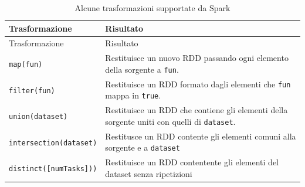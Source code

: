 \documentclass[italian,a4paper, twoside, 12pt]{report}
\begin{document}
\begin{longtable}[]{@{}ll@{}}
\caption{Alcune trasformazioni supportate da Spark}\tabularnewline
\toprule
\begin{minipage}[b]{0.34\columnwidth}\raggedright\strut
Trasformazione\strut
\end{minipage} & \begin{minipage}[b]{0.57\columnwidth}\raggedright\strut
Risultato\strut
\end{minipage}\tabularnewline
\midrule
\endfirsthead
\toprule
\begin{minipage}[b]{0.34\columnwidth}\raggedright\strut
Trasformazione\strut
\end{minipage} & \begin{minipage}[b]{0.57\columnwidth}\raggedright\strut
Risultato\strut
\end{minipage}\tabularnewline
\midrule
\endhead
\begin{minipage}[t]{0.34\columnwidth}\raggedright\strut
\lstinline!map(fun)!\strut
\end{minipage} & \begin{minipage}[t]{0.57\columnwidth}\raggedright\strut
Restituisce un nuovo RDD passando ogni elemento della sorgente a
\lstinline!fun!.\strut
\end{minipage}\tabularnewline
\begin{minipage}[t]{0.34\columnwidth}\raggedright\strut
\lstinline!filter(fun)!\strut
\end{minipage} & \begin{minipage}[t]{0.57\columnwidth}\raggedright\strut
Restituisce un RDD formato dagli elementi che \lstinline!fun! mappa in
\lstinline!true!.\strut
\end{minipage}\tabularnewline
\begin{minipage}[t]{0.34\columnwidth}\raggedright\strut
\lstinline!union(dataset)!\strut
\end{minipage} & \begin{minipage}[t]{0.57\columnwidth}\raggedright\strut
Restituisce un RDD che contiene gli elementi della sorgente uniti con
quelli di \lstinline!dataset!.\strut
\end{minipage}\tabularnewline
\begin{minipage}[t]{0.34\columnwidth}\raggedright\strut
\lstinline!intersection(dataset)!\strut
\end{minipage} & \begin{minipage}[t]{0.57\columnwidth}\raggedright\strut
Restitusce un RDD contente gli elementi comuni alla sorgente e a
\lstinline!dataset!\strut
\end{minipage}\tabularnewline
\begin{minipage}[t]{0.34\columnwidth}\raggedright\strut
\lstinline!distinct([numTasks]))!\strut
\end{minipage} & \begin{minipage}[t]{0.57\columnwidth}\raggedright\strut
Restituisce un RDD contentente gli elementi del dataset senza
ripetizioni\strut
\end{minipage}\tabularnewline
\bottomrule
\end{longtable}
\end{document}
